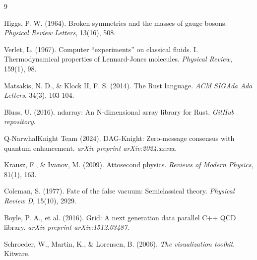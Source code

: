 \documentclass[12pt,a4paper]{article}
\begin{document}
\begin{thebibliography}{9}

Higgs, P. W. (1964). Broken symmetries and the masses of gauge bosons. \textit{Physical Review Letters}, 13(16), 508.

Verlet, L. (1967). Computer ``experiments'' on classical fluids. I. Thermodynamical properties of Lennard-Jones molecules. \textit{Physical Review}, 159(1), 98.

Matsakis, N. D., \& Klock II, F. S. (2014). The Rust language. \textit{ACM SIGAda Ada Letters}, 34(3), 103-104.

Bluss, U. (2016). ndarray: An N-dimensional array library for Rust. \textit{GitHub repository}.

Q-NarwhalKnight Team (2024). DAG-Knight: Zero-message consensus with quantum enhancement. \textit{arXiv preprint arXiv:2024.xxxxx}.

Krausz, F., \& Ivanov, M. (2009). Attosecond physics. \textit{Reviews of Modern Physics}, 81(1), 163.

Coleman, S. (1977). Fate of the false vacuum: Semiclassical theory. \textit{Physical Review D}, 15(10), 2929.

Boyle, P. A., et al. (2016). Grid: A next generation data parallel C++ QCD library. \textit{arXiv preprint arXiv:1512.03487}.

Schroeder, W., Martin, K., \& Lorensen, B. (2006). \textit{The visualization toolkit}. Kitware.

\end{thebibliography}
\end{document}
